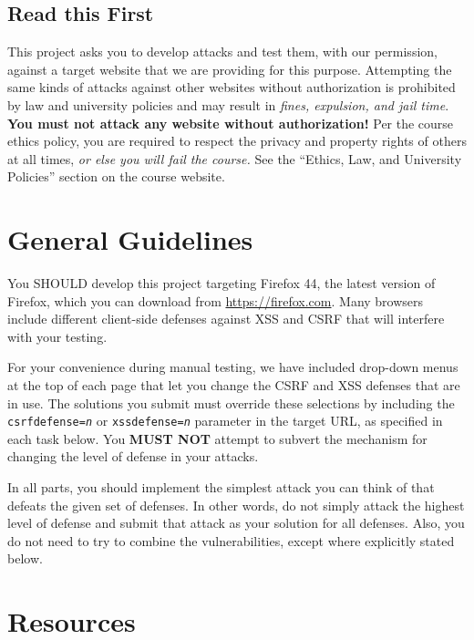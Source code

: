 \documentclass[letterpaper,12pt]{report}
\newcommand{\firefox}{Firefox 44}
\begin{document}
\smallskip

\subsection*{Read this First}

This project asks you to develop attacks and test them, with our permission, against a target website that we are providing for this purpose.  Attempting the same kinds of attacks against other websites without authorization is prohibited by law and university policies and may result in \emph{fines, expulsion, and jail time}.   \textbf{You must not attack any website without authorization!}  Per the course ethics policy, you are required to respect the privacy and  property rights of others at all times, \emph{or else you will fail the course.}  See the ``Ethics, Law, and University Policies'' section on the course website.

\newpage

\section*{General Guidelines}

You SHOULD develop this project targeting \firefox, the latest version of Firefox, which you can download from \url{https://firefox.com}.  Many browsers include different client-side defenses against XSS and CSRF that will interfere with your testing.

\medskip

For your convenience during manual testing, we have included drop-down menus at the top of each page that let you change the CSRF and XSS defenses that are in use.  The solutions you submit must override these selections by including the \texttt{csrfdefense=\emph{n}} or \texttt{xssdefense=\emph{n}} parameter in the target URL, as specified in each task below.  You \textbf{MUST NOT} attempt to subvert the mechanism for changing the level of defense in your attacks.

\medskip

In all parts, you should implement the simplest attack you can think of that defeats the given set of defenses. In other words, do not simply attack the highest level of defense and submit that attack as your solution for all defenses. Also, you do not need to try to combine the vulnerabilities, except where explicitly stated below.

\section*{Resources} 
\label{sec:resources}
\end{document}
